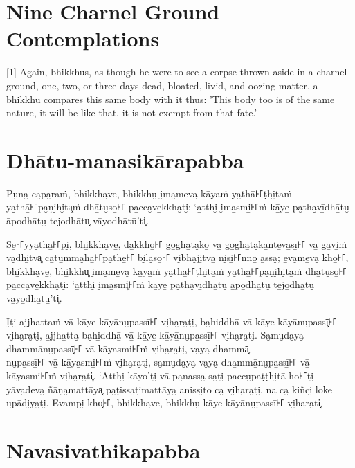 \section{Nine Charnel Ground Contemplations}

[1] Again, bhikkhus, as though he were to see a corpse thrown aside in a charnel
ground, one, two, or three days dead, bloated, livid, and oozing matter, a
bhikkhu compares this same body with it thus: 'This body too is of the same
nature, it will be like that, it is not exempt from that fate.'

\paliPage
\section*{Dhātu-manasikārapabba}

Pu̮na̮ ca̮pa̮ra̱ṁ, bhi̱kkha̮ve̱, bhi̱kkhu̮ i̮ma̮me̱va̮ kā̱ya̱ṁ ya̮thā̱꜔꜒ṭhi̮ta̱ṁ ya̮thā̱꜔꜒pa̮ṇi̮hi̮ta͓ṁ
dhā̱tu̮so̱꜔꜒ pa̱cca̮ve̱kkha̮ti̮: ‘a̱tthi̮ i̮ma̱smi̱꜔꜒ṁ kā̱ye̱ pa̮tha̮vī̱dhā̱tu̮ ā̱po̱dhā̱tu̮ te̱jo̱dhā̱tu͓
vā̱yo̱dhā̱tū̱’ti͓.

Se̱꜔꜒yya̮thā̱꜔꜒pi̮, bhi̱kkha̮ve̱, da̱kkho̱꜔꜒ go̱ghā̱ta̮ko̱ vā̱ go̱ghā̱ta̮ka̱nte̱vā̱sī̱꜔꜒ vā̱ gā̱vi̱ṁ va̮dhi̱tvā͓
cā̱tu̱mma̮hā̱꜔꜒pa̮the̱꜔꜒ bi̮la̮so̱꜔꜒ vi̮bha̮ji̱tvā̱ ni̮si̱꜔꜒nno̱ a̱ssa̮; e̱va̮me̱va̮ kho̱꜔꜒, bhi̱kkha̮ve̱, bhi̱kkhu͓
i̮ma̮me̱va̮ kā̱ya̱ṁ ya̮thā̱꜔꜒ṭhi̮ta̱ṁ ya̮thā̱꜔꜒pa̮ṇi̮hi̮ta̱ṁ dhā̱tu̮so̱꜔꜒ pa̱cca̮ve̱kkha̮ti̮: ‘a̱tthi̮ i̮ma̱smi͓꜔꜒ṁ
kā̱ye̱ pa̮tha̮vī̱dhā̱tu̮ ā̱po̱dhā̱tu̮ te̱jo̱dhā̱tu̮ vā̱yo̱dhā̱tū̱’ti͓.

I̮ti̮ a̱jjha̱tta̱ṁ vā̱ kā̱ye̱ kā̱yā̱nu̮pa̱ssī̱꜔꜒ vi̮ha̮ra̮ti̮, ba̮hi̱ddhā̱ vā̱ kā̱ye̱ kā̱yā̱nu̮pa̱ssī͓꜔꜒
vi̮ha̮ra̮ti̮, a̱jjha̱tta̮-ba̮hi̱ddhā̱ vā̱ kā̱ye̱ kā̱yā̱nu̮pa̱ssī̱꜔꜒ vi̮ha̮ra̮ti̮. Sa̮mu̮da̮ya̮-dha̱mmā̱nu̮pa̱ssī͓꜔꜒
vā̱ kā̱ya̱smi̱꜔꜒ṁ vi̮ha̮ra̮ti̮, va̮ya̮-dha̱mmā͓-\\
nu̮pa̱ssī̱꜔꜒ vā̱ kā̱ya̱smi̱꜔꜒ṁ vi̮ha̮ra̮ti̮, sa̮mu̮da̮ya̮-va̮ya̮-dha̱mmā̱nu̮pa̱ssī̱꜔꜒ vā̱ kā̱ya̱smi̱꜔꜒ṁ vi̮ha̮ra̮ti͓.
‘A̱tthi̮ kā̱yo̱’ti̮ vā̱ pa̮na̱ssa̮ sa̮ti̮ pa̱ccu̮pa̱ṭṭhi̮tā̱ ho̱꜔꜒ti̮ yā̱va̮de̱va̮ ñā̱ṇa̮ma̱ttā̱ya͓
pa̮ṭi̱ssa̮ti̮ma̱ttā̱ya̮ a̮ni̱ssi̮to̱ ca̮ vi̮ha̮ra̮ti̮, na̮ ca̮ ki̱ñci̮ lo̱ke̱ u̮pā̱di̮ya̮ti̮. E̱va̱mpi̮ kho͓꜔꜒,
bhi̱kkha̮ve̱, bhi̱kkhu̮ kā̱ye̱ kā̱yā̱nu̮pa̱ssī̱꜔꜒ vi̮ha̮ra̮ti͓.


\section*{Navasivathikapabba}

